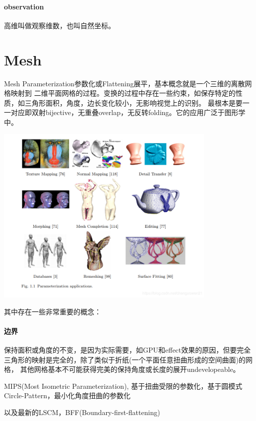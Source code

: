 \paragraph{observation}
高维叫做观察维数，也叫自然坐标。


\section{Mesh}
Mesh Parameterization参数化或Flattening展平，基本概念就是一个三维的离散网格映射到
二维平面网格的过程。变换的过程中存在一些约束，如保存特定的性质，如三角形面积，角度，边长变化较小，无影响视觉上的识别。
最根本是要一一对应即双射bijective，无重叠overlap，无反转folding。它的应用广泛于图形学中。

\begin{center}
    \includegraphics[width=0.8\textwidth]{images/mesh_parameterization_applications.png}
\end{center}

其中存在一些非常重要的概念：
\paragraph{边界}
保持面积或角度的不变，是因为实际需要，如GPU和effect效果的原因，但要完全三角形的映射是完全的，除了类似于折纸(一个平面任意扭曲形成的空间曲面)的网格，
其他网格基本不可能获得完美的保持角度或长度的展开undevelopeable。 

MIPS(Most Isometric Parameterization), 基于扭曲受限的参数化，基于圆模式Circle-Pattern，最小化角度扭曲的参数化

以及最新的LSCM，BFF(Boundary-first-flattening)
